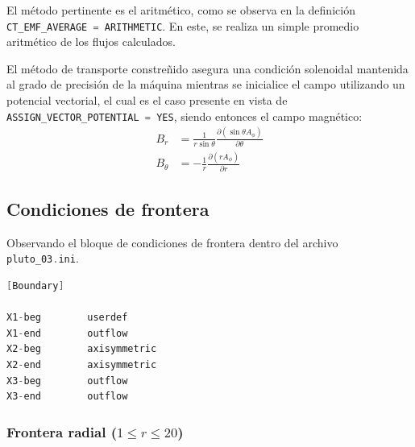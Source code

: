 \documentclass[11pt, letterpaper]{article}
\begin{document}
\medskip

El método pertinente es el aritmético, como se observa en la definición \lstinline[language=C]{CT_EMF_AVERAGE = ARITHMETIC}. En este, se realiza un simple promedio aritmético de los flujos calculados.

\medskip

El método de transporte constreñido asegura una condición solenoidal mantenida al grado de precisión de la máquina mientras se inicialice el campo utilizando un potencial vectorial, el cual es el caso presente en vista de \lstinline[language=C]{ASSIGN_VECTOR_POTENTIAL = YES}, siendo entonces el campo magnético:
\begin{subequations}\label{eq:BField_Vectorpotential}
    \begin{align}
        B_r &= \frac{1}{r \sin \theta} \frac{\partial (\sin \theta A_\phi)}{\partial \theta} \\[5pt]
        B_\theta &= -\frac{1}{r} \frac{\partial (r A_\phi)}{\partial r}
    \end{align}
\end{subequations}

\subsection{Condiciones de frontera}

Observando el bloque de condiciones de frontera dentro del archivo \lstinline[language=C]{pluto_03.ini}.
\begin{lstlisting}[language=C, caption={Definiciones de condiciones de frontera (pluto\_03.ini)}, label={lst:ini_boundary}]
[Boundary]

X1-beg        userdef
X1-end        outflow
X2-beg        axisymmetric
X2-end        axisymmetric
X3-beg        outflow
X3-end        outflow
\end{lstlisting}

\subsubsection{\texorpdfstring{Frontera radial ($1 \leq r \leq 20$)}
  {Frontera radial (1 <= r <= 20)}}
\end{document}
